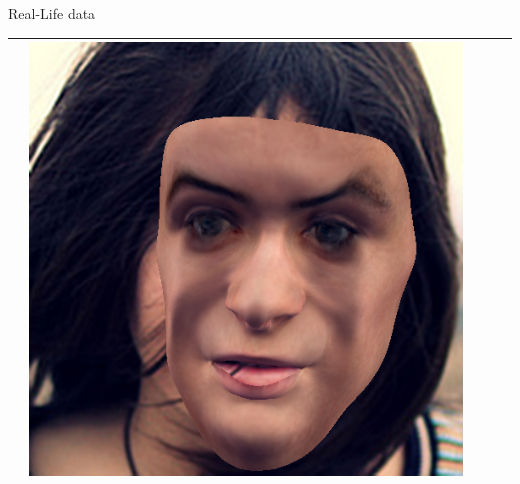 \documentclass{beamer}
\begin{document}
\begin{frame}[c]{Real-Life data}
\begin{table}[h!]
\begin{tabular}{ | m{1.8cm} | m{1.8cm} | m{1.8cm}| m{1.8cm} | m{1.8cm} |}
\begin{minipage}{1.8cm}
				\vspace{1pt}
			\end{minipage}
			& 
			\begin{minipage}{1.8cm}
				\centering
				\vspace{1pt}
				\includegraphics[width=\linewidth]{realLife/test8_overlay_FCN.png}
				\vspace{1pt}
			\end{minipage} \\ \hline
		\end{tabular}
	\end{table}
\end{frame}

\end{document}
